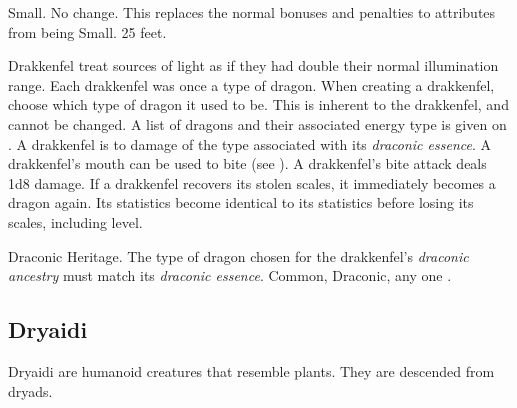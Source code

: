          Small.
         No change. This replaces the normal bonuses and penalties to attributes from being Small.
         25 feet.
        \begin{itemize}
             Drakkenfel treat sources of light as if they had double their normal illumination range.
             Each drakkenfel was once a type of dragon.
                When creating a drakkenfel, choose which type of dragon it used to be.
                This is inherent to the drakkenfel, and cannot be changed.
                A list of dragons and their associated energy type is given on .
             A drakkenfel is  to damage of the type associated with its \textit{draconic essence}.
             A drakkenfel's mouth can be used to bite (see ). A drakkenfel's bite attack deals 1d8 damage.
             If a drakkenfel recovers its stolen scales, it immediately becomes a dragon again.
                Its statistics become identical to its statistics before losing its scales, including level.
        \end{itemize}
         Draconic Heritage. The type of dragon chosen for the drakkenfel's \textit{draconic ancestry} must match its \textit{draconic essence}.
         Common, Draconic, any one .

    \subsection{Dryaidi}

        Dryaidi are humanoid creatures that resemble plants. They are descended from dryads.

